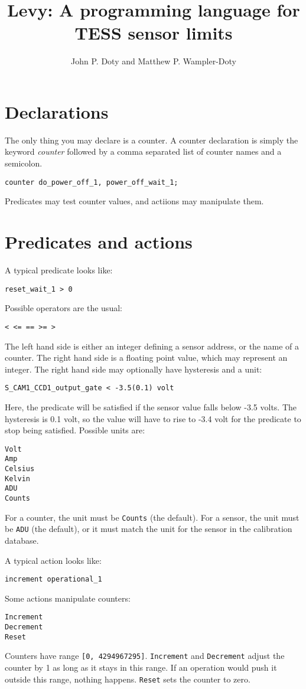\documentclass[12pt]{article}
\begin{document}
\title{Levy: A programming language for TESS sensor limits}
\author{John P. Doty and Matthew P. Wampler-Doty}
\maketitle
\section{Declarations}
The only thing you may declare is a counter. A counter declaration is simply the keyword \emph{counter} followed by a comma separated list of counter names and a semicolon. \begin{verbatim}
counter do_power_off_1, power_off_wait_1;
\end{verbatim}
Predicates may test counter values, and actiions may manipulate them.

\section{Predicates and actions}
A typical predicate looks like:
\begin{verbatim}
reset_wait_1 > 0
\end{verbatim}
Possible operators are the usual:
\begin{verbatim}
< <= == >= >
\end{verbatim}
The left hand side is either an integer defining a sensor address, or the name of a counter. The right hand side is a floating point value, which may represent an integer. The right hand side may optionally have hysteresis and a unit:
\begin{verbatim}
S_CAM1_CCD1_output_gate < -3.5(0.1) volt
\end{verbatim}
Here, the predicate will be satisfied if the sensor value falls below -3.5 volts. The hysteresis is 0.1 volt, so the value will have to rise to -3.4 volt for the predicate to stop being satisfied. Possible units are:
\begin{verbatim}
Volt
Amp
Celsius
Kelvin
ADU
Counts
\end{verbatim}
For a counter, the unit must be \verb/Counts/ (the default). For a sensor, the unit must be \verb/ADU/ (the default), or it must match the unit for the sensor in the calibration database.

A typical action looks like:
\begin{verbatim}
increment operational_1
\end{verbatim}
Some actions manipulate counters:
\begin{verbatim}
Increment
Decrement
Reset
\end{verbatim}
Counters have range \verb/[0, 4294967295]/. \verb/Increment/ and \verb/Decrement/ adjust the counter by 1 as long as it stays in this range. If an operation would push it outside this range, nothing happens. \verb/Reset/ sets the counter to zero.
\end{document}
